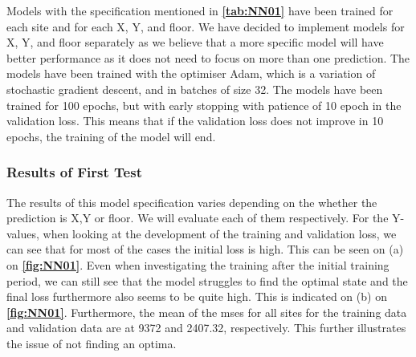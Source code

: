 Models with the specification mentioned in \textbf{\autoref{tab:NN01}} have been trained for each site and for each X, Y, and floor. We have decided to implement models for X, Y, and floor separately as we believe that a more specific model will have better performance as it does not need to focus on more than one prediction. The models have been trained with the optimiser Adam, which is a variation of stochastic gradient descent, and in batches of size 32. The models have been trained for 100 epochs, but with early stopping with patience of 10 epoch in the validation loss. This means that if the validation loss does not improve in 10 epochs, the training of the model will end.

\subsubsection{Results of First Test}
The results of this model specification varies depending on the whether the prediction is X,Y or floor. We will evaluate each of them respectively. For the Y-values, when looking at the development of the training and validation loss, we can see that for most of the cases the initial loss is high. This can be seen on (a) on \textbf{\autoref{fig:NN01}}. Even when investigating the training after the initial training period, we can still see that the model struggles to find the optimal state and the final loss furthermore also seems to be quite high. This is indicated on (b) on \textbf{\autoref{fig:NN01}}. Furthermore, the mean of the \gls{mse}s for all sites for the training data and validation data are at 9372 and 2407.32, respectively. This further illustrates the issue of not finding an optima. 

